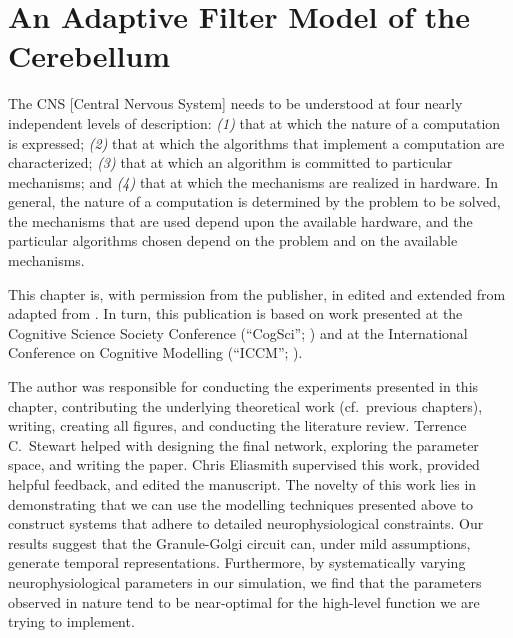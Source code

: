 
\chapter{An Adaptive Filter Model of the Cerebellum}
\label{chp:cerebellum}

\vspace{5pt}

\begin{OpeningQuote}
The CNS [Central Nervous System] needs to be understood at four nearly independent levels of description: \emph{(1)} that at which the nature of a computation is expressed; \emph{(2)} that at which the algorithms that implement a computation are characterized; \emph{(3)} that at which an algorithm is committed to particular mechanisms; and \emph{(4)} that at which the mechanisms are realized in hardware.
In general, the nature of a computation is determined by the problem to be solved, the mechanisms that are used depend upon the available hardware, and the particular algorithms chosen depend on the problem and on the available mechanisms.
\end{OpeningQuote}

\begin{PriorPublication}
This chapter is, with permission from the publisher, in edited and extended from adapted from \citet{stockel2021connecting}.
In turn, this publication is based on work presented at the Cognitive Science Society Conference (\enquote{CogSci}; \cite{stockel2020biologically}) and at the International Conference on Cognitive Modelling (\enquote{ICCM}; \cite{stockel2020connecting}).
\end{PriorPublication}

\begin{Contributions}
The author was responsible for conducting the experiments presented in this chapter, contributing the underlying theoretical work (cf.~previous chapters), writing, creating all figures, and conducting the literature review.
Terrence C.~Stewart helped with designing the final network, exploring the parameter space, and writing the paper.
Chris Eliasmith supervised this work, provided helpful feedback, and edited the manuscript.
The novelty of this work lies in demonstrating that we can use the modelling techniques presented above to construct systems that adhere to detailed neurophysiological constraints.
Our results suggest that the Granule-Golgi circuit can, under mild assumptions, generate temporal representations.
Furthermore, by systematically varying neurophysiological parameters in our simulation, we find that the parameters observed in nature tend to be near-optimal for the high-level function we are trying to implement.
\end{Contributions}

